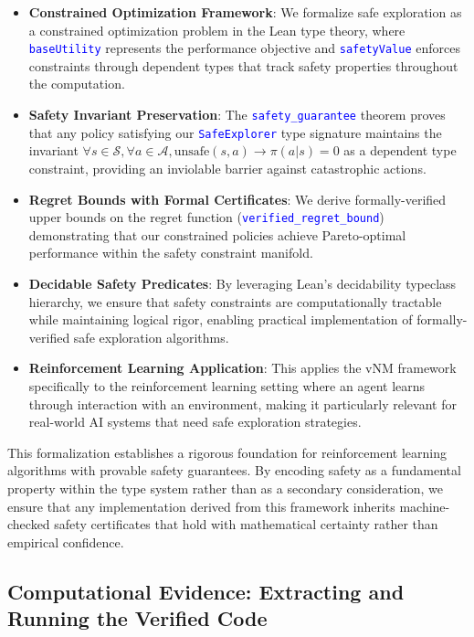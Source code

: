 \documentclass{article}
\theoremstyle{definition}
\newcommand{\tactic}[1]{\textcolor{blue}{\texttt{#1}}}
\begin{document}
\begin{itemize}
  \item \textbf{Constrained Optimization Framework}: We formalize safe exploration as a constrained optimization problem in the Lean type theory, where \tactic{baseUtility} represents the performance objective and \tactic{safetyValue} enforces constraints through dependent types that track safety properties throughout the computation.

  \item \textbf{Safety Invariant Preservation}: The \tactic{safety\_guarantee} theorem proves that any policy satisfying our \tactic{SafeExplorer} type signature maintains the invariant $\forall s \in \mathcal{S}, \forall a \in \mathcal{A}, \text{unsafe}(s,a) \to \pi(a|s) = 0$ as a dependent type constraint, providing an inviolable barrier against catastrophic actions.

  \item \textbf{Regret Bounds with Formal Certificates}: We derive formally-verified upper bounds on the regret function (\tactic{verified\_regret\_bound}) demonstrating that our constrained policies achieve Pareto-optimal performance within the safety constraint manifold.

  \item \textbf{Decidable Safety Predicates}: By leveraging Lean's decidability typeclass hierarchy, we ensure that safety constraints are computationally tractable while maintaining logical rigor, enabling practical implementation of formally-verified safe exploration algorithms.
   \item \textbf{Reinforcement Learning Application}: This applies the vNM framework specifically to the reinforcement learning setting where an agent learns through interaction with an environment, making it particularly relevant for real-world AI systems that need safe exploration strategies.
\end{itemize}

This formalization establishes a rigorous foundation for reinforcement learning algorithms with provable safety guarantees. By encoding safety as a fundamental property within the type system rather than as a secondary consideration, we ensure that any implementation derived from this framework inherits machine-checked safety certificates that hold with mathematical certainty rather than empirical confidence.

\subsection{Computational Evidence: Extracting and Running the Verified Code}\label{sec:ai:comput Evid}
\end{document}
